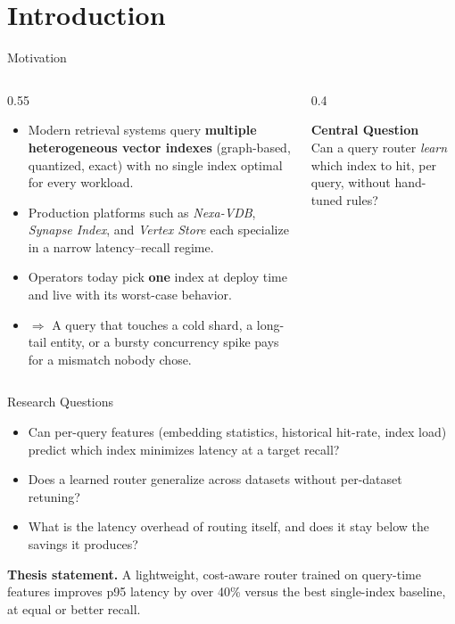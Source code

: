 \section{Introduction}

\begin{frame}{Motivation}
\begin{columns}[T]
\begin{column}{0.55\textwidth}
\begin{itemize}[label=\textbullet]
\item Modern retrieval systems query \textbf{multiple heterogeneous vector indexes} (graph-based, quantized, exact) with no single index optimal for every workload.
\item Production platforms such as \textit{Nexa-VDB}, \textit{Synapse Index}, and \textit{Vertex Store} each specialize in a narrow latency--recall regime.
\item Operators today pick \textbf{one} index at deploy time and live with its worst-case behavior.
\item $\Rightarrow$ A query that touches a cold shard, a long-tail entity, or a bursty concurrency spike pays for a mismatch nobody chose.
\end{itemize}
\end{column}
\begin{column}{0.4\textwidth}
\begin{tcolorbox}[colback=thesisnavy,coltext=white,colframe=thesisnavy,arc=3pt,boxrule=0pt]
\centering
\footnotesize\textbf{Central Question}\\[4pt]
\normalsize Can a query router \emph{learn} which index to hit, per query, without hand-tuned rules?
\end{tcolorbox}
\end{column}
\end{columns}
\end{frame}

\begin{frame}{Research Questions}
\begin{itemize}[leftmargin=2.4em]
\item[{\textbf{RQ1.}}] Can per-query features (embedding statistics, historical hit-rate, index load) predict which index minimizes latency at a target recall?
\item[{\textbf{RQ2.}}] Does a learned router generalize across datasets without per-dataset retuning?
\item[{\textbf{RQ3.}}] What is the latency overhead of routing itself, and does it stay below the savings it produces?
\end{itemize}
\vspace{0.4cm}
\begin{takeaway}
\textbf{Thesis statement.} A lightweight, cost-aware router trained on query-time features improves p95 latency by over 40\% versus the best single-index baseline, at equal or better recall.
\end{takeaway}
\end{frame}

